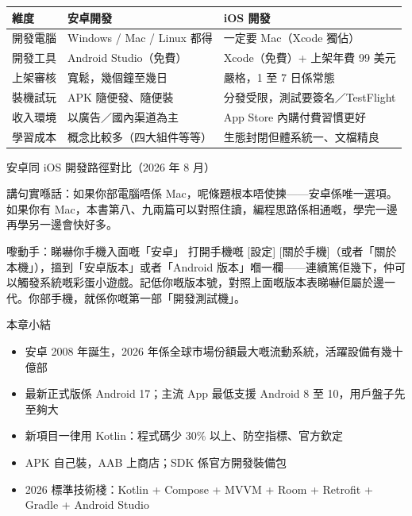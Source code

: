 \begin{center}
\begin{tabularx}{\linewidth}{|X|X|X|}
\hline
\textbf{維度} & \textbf{安卓開發} & \textbf{iOS 開發} \tabularnewline
\hline
開發電腦 & Windows / Mac / Linux 都得 & 一定要 Mac（Xcode 獨佔） \tabularnewline
開發工具 & Android Studio（免費） & Xcode（免費）+ 上架年費 99 美元 \tabularnewline
上架審核 & 寬鬆，幾個鐘至幾日 & 嚴格，1 至 7 日係常態 \tabularnewline
裝機試玩 & APK 隨便發、隨便裝 & 分發受限，測試要簽名／TestFlight \tabularnewline
收入環境 & 以廣告／國內渠道為主 & App Store 內購付費習慣更好 \tabularnewline
學習成本 & 概念比較多（四大組件等等） & 生態封閉但體系統一、文檔精良 \tabularnewline
\hline
\end{tabularx}
\end{center}

\begin{center}\small\color{gray}安卓同 iOS 開發路徑對比（2026 年 8 月）\end{center}

講句實喺話：如果你部電腦唔係 Mac，呢條題根本唔使揀——安卓係唯一選項。如果你有 Mac，本書第八、九兩篇可以對照住讀，編程思路係相通嘅，學完一邊再學另一邊會快好多。

\begin{tcbpractice}{嚟動手：睇嚇你手機入面嘅「安卓」}
打開手機嘅 [設定] [關於手機]（或者「關於本機」），搵到「安卓版本」或者「Android 版本」嗰一欄——連續篤佢幾下，仲可以觸發系統嘅彩蛋小遊戲。記低你嘅版本號，對照上面嘅版本表睇嚇佢屬於邊一代。你部手機，就係你嘅第一部「開發測試機」。

\end{tcbpractice}

\begin{tcbsummary}{本章小結}
\begin{itemize}
  \item 安卓 2008 年誕生，2026 年係全球市場份額最大嘅流動系統，活躍設備有幾十億部
  \item 最新正式版係 Android 17；主流 App 最低支援 Android 8 至 10，用戶盤子先至夠大
  \item 新項目一律用 Kotlin：程式碼少 30\% 以上、防空指標、官方欽定
  \item APK 自己裝，AAB 上商店；SDK 係官方開發裝備包
  \item 2026 標準技術棧：Kotlin + Compose + MVVM + Room + Retrofit + Gradle + Android Studio
\end{itemize}

\end{tcbsummary}
